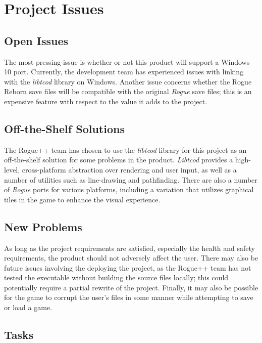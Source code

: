 \documentclass[12pt, titlepage]{article}
\begin{document}
\newpage

\section{Project Issues}

	\subsection{Open Issues}

	The most pressing issue is whether or not this product will support a Windows 10 port.  Currently, the development team has experienced issues with linking with the \textit{libtcod} library on Windows.  Another issue concerns whether the Rogue Reborn save files will be compatible with the original \textit{Rogue} save files; this is an expensive feature with respect to the value it adds to the project. 

	\subsection{Off-the-Shelf Solutions}

	The Rogue++ team has chosen to use the \textit{libtcod} library for this project as an off-the-shelf solution for some problems in the product.  \textit{Libtcod} provides a high-level, cross-platform abstraction over rendering and user input, as well as a number of utilities such as line-drawing and pathfinding.  There are also a number of \textit{Rogue} ports for various platforms, including a variation that utilizes graphical tiles in the game to enhance the visual experience.

	\subsection{New Problems}

	As long as the project requirements are satisfied, especially the health and safety requirements, the product should not adversely affect the user.  There may also be future issues involving the deploying the project, as the Rogue++ team has not tested the executable without building the source files locally; this could potentially require a partial rewrite of the project.  Finally, it may also be possible for the game to corrupt the user's files in some manner while attempting to save or load a game.

	\subsection{Tasks}
\end{document}
